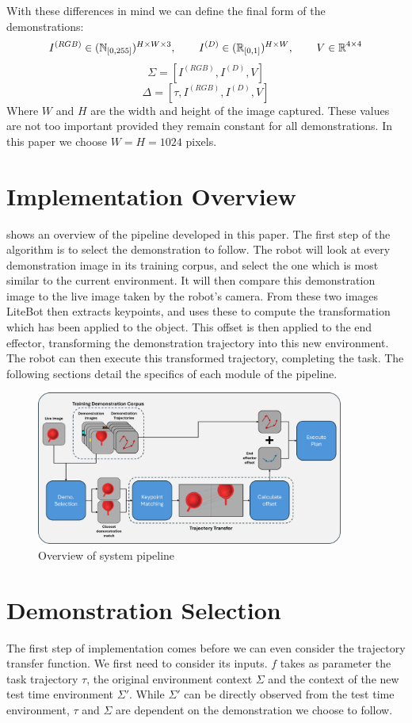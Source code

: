 With these differences in mind we can define the final form of the demonstrations:
$$I^{(RGB)} \in (\operatorname{\mathbb{N}}_{[0,255]})^{H \times W \times 3}, \operatorname{\operatorname{\: \: \: \:} \operatorname{\: \: \: \:}}
I^{(D)} \in (\operatorname{\mathbb{R}}_{[0,1]})^{H \times W}, \operatorname{\operatorname{\: \: \: \:} \operatorname{\: \: \: \:}}
V \in \operatorname{\mathbb{R}}^{4 \times 4}$$
$$\Sigma = [I^{(RGB)}, I^{(D)}, V]$$
$$\Delta = [\tau, I^{(RGB)}, I^{(D)}, V]$$
Where $W$ and $H$ are the width and height of the image captured. These values are not too important provided they remain constant for all demonstrations. In this paper we choose $W=H=1024$ pixels.


\section{Implementation Overview}
\label{sec:implementation}

 shows an overview of the pipeline developed in this paper. The first step of the algorithm is to select the demonstration to follow. The robot will look at every demonstration image in its training corpus, and select the one which is most similar to the current environment. It will then compare this demonstration image to the live image taken by the robot's camera. From these two images LiteBot then extracts keypoints, and uses these to compute the transformation which has been applied to the object. This offset is then applied to the end effector, transforming the demonstration trajectory into this new environment. The robot can then execute this transformed trajectory, completing the task. The following sections detail the specifics of each module of the pipeline.

\begin{figure}[h]
    \centering
    \includegraphics[width=0.9\textwidth]{figures/pipeline.png}
    \caption{Overview of system pipeline}
    \label{fig:pipeline}
\end{figure}

\section{Demonstration Selection}
\label{sec:demo-selection}
The first step of implementation comes before we can even consider the trajectory transfer function. We first need to consider its inputs. $f$ takes as parameter the task trajectory $\tau$, the original environment context $\Sigma$ and the context of the new test time environment $\Sigma'$. While $\Sigma'$ can be directly observed from the test time environment, $\tau$ and $\Sigma$ are dependent on the demonstration we choose to follow.\\

